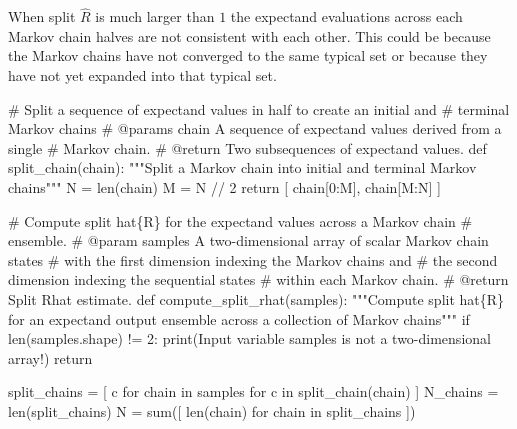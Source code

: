 \documentclass[
  letterpaper,
  DIV=11,
  numbers=noendperiod]{scrartcl}
\newenvironment{Shaded}{\begin{snugshade}}{\end{snugshade}}
\newcommand{\BuiltInTok}[1]{\textcolor[rgb]{0.00,0.23,0.31}{#1}}
\newcommand{\CommentTok}[1]{\textcolor[rgb]{0.37,0.37,0.37}{#1}}
\newcommand{\ControlFlowTok}[1]{\textcolor[rgb]{0.00,0.23,0.31}{#1}}
\newcommand{\DecValTok}[1]{\textcolor[rgb]{0.68,0.00,0.00}{#1}}
\newcommand{\KeywordTok}[1]{\textcolor[rgb]{0.00,0.23,0.31}{#1}}
\newcommand{\NormalTok}[1]{\textcolor[rgb]{0.00,0.23,0.31}{#1}}
\newcommand{\OperatorTok}[1]{\textcolor[rgb]{0.37,0.37,0.37}{#1}}
\newcommand{\StringTok}[1]{\textcolor[rgb]{0.13,0.47,0.30}{#1}}
\begin{document}
When split \(\hat{R}\) is much larger than \(1\) the expectand
evaluations across each Markov chain halves are not consistent with each
other. This could be because the Markov chains have not converged to the
same typical set or because they have not yet expanded into that typical
set.

\begin{Shaded}
\begin{Highlighting}[]
\CommentTok{\# Split a sequence of expectand values in half to create an initial and }
\CommentTok{\# terminal Markov chains}
\CommentTok{\# @params chain A sequence of expectand values derived from a single }
\CommentTok{\#               Markov chain.}
\CommentTok{\# @return Two subsequences of expectand values.}
\KeywordTok{def}\NormalTok{ split\_chain(chain):}
  \CommentTok{"""Split a Markov chain into initial and terminal Markov chains"""}
\NormalTok{  N }\OperatorTok{=} \BuiltInTok{len}\NormalTok{(chain)}
\NormalTok{  M }\OperatorTok{=}\NormalTok{ N }\OperatorTok{//} \DecValTok{2}
  \ControlFlowTok{return}\NormalTok{ [ chain[}\DecValTok{0}\NormalTok{:M], chain[M:N] ]}

\CommentTok{\# Compute split hat\{R\} for the expectand values across a Markov chain }
\CommentTok{\# ensemble.}
\CommentTok{\# @param samples A two{-}dimensional array of scalar Markov chain states }
\CommentTok{\#                with the first dimension indexing the Markov chains and }
\CommentTok{\#                the second dimension indexing the sequential states }
\CommentTok{\#                within each Markov chain.}
\CommentTok{\# @return Split Rhat estimate.}
\KeywordTok{def}\NormalTok{ compute\_split\_rhat(samples):}
  \CommentTok{"""Compute split hat\{R\} for an expectand output ensemble across}
\CommentTok{     a collection of Markov chains"""}
  \ControlFlowTok{if} \BuiltInTok{len}\NormalTok{(samples.shape) }\OperatorTok{!=} \DecValTok{2}\NormalTok{:}
    \BuiltInTok{print}\NormalTok{(}\StringTok{\textquotesingle{}Input variable \textasciigrave{}samples\textasciigrave{} is not a two{-}dimensional array!\textquotesingle{}}\NormalTok{)}
    \ControlFlowTok{return}
  
\NormalTok{  split\_chains }\OperatorTok{=}\NormalTok{ [ c }\ControlFlowTok{for}\NormalTok{ chain }\KeywordTok{in}\NormalTok{ samples }\ControlFlowTok{for}\NormalTok{ c }\KeywordTok{in}\NormalTok{ split\_chain(chain) ]}
\NormalTok{  N\_chains }\OperatorTok{=} \BuiltInTok{len}\NormalTok{(split\_chains)}
\NormalTok{  N }\OperatorTok{=} \BuiltInTok{sum}\NormalTok{([ }\BuiltInTok{len}\NormalTok{(chain) }\ControlFlowTok{for}\NormalTok{ chain }\KeywordTok{in}\NormalTok{ split\_chains ])}
  

\end{Highlighting}
\end{Shaded}
\end{document}
